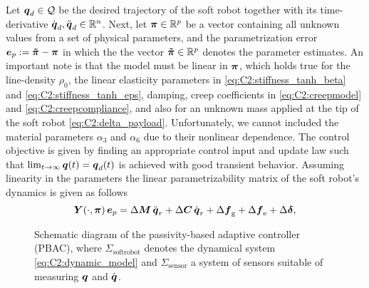 Let ${\boldsymbol{q}}_d \in \mathcal{Q}$ be the desired trajectory of the soft robot together with its time-derivative ${\dot{\boldsymbol{q}}}_d,{\ddot{\boldsymbol{q}}}_d \in {\mathbb{R}^n}$. Next, let $\boldsymbol{\pi} \in \mathbb{R}^p$ be a vector containing all unknown values from a set of physical parameters, and the parametrization error $\boldsymbol{e}_{p} := \boldsymbol{\tilde{\boldsymbol{\pi}}} - \boldsymbol{\pi}$ in which the the vector $\boldsymbol{\tilde{\pi}} \in \mathbb{R}^p$ denotes the parameter estimates.  An important note is that the model must be linear in $\boldsymbol{\pi}$, which holds true for the line-density $\rho_0$, the linear elasticity parameters in \eqref{eq:C2:stiffness_tanh_beta} and \eqref{eq:C2:stiffness_tanh_eps}, damping, creep coefficients in \eqref{eq:C2:creepmodel} and \eqref{eq:C2:creepcompliance}, and also for an unknown mass applied at the tip of the soft robot \eqref{eq:C2:delta_payload}. Unfortunately, we cannot included the material parameters $\alpha_3$  and $\alpha_6$ due to their nonlinear dependence. The control objective is given by finding an appropriate control input and update law such that $\lim_{t\to \infty} {\boldsymbol{q}}(t) = {\boldsymbol{q}}_d(t)$ is achieved with good transient behavior. Assuming linearity in the parameters
the linear parametrizability matrix of the soft robot's dynamics is given as follows
%
\begin{equation}
\boldsymbol{Y}(\cdot,\boldsymbol{\pi})\,{\boldsymbol{e}_p} = \Delta \boldsymbol{M}\,{\ddot{\boldsymbol{q}}}_r + \Delta \boldsymbol{C}\,{\dot{\boldsymbol{q}}}_r + \Delta \boldsymbol{f}_{\scriptstyle\textrm{g}} +  \Delta\boldsymbol{f}_{\scriptstyle\textrm{e}} +  \Delta \boldsymbol{\delta},\label{eq:regress}
\end{equation}
%

\begin{figure}[!t]
    \vspace{-0.6mm}
    \centering
    
    \caption{Schematic diagram of the passivity-based adaptive controller (PBAC), where $\Sigma_{\textrm{softrobot}}$ denotes the dynamical system \eqref{eq:C2:dynamic_model} and $\Sigma_{\textrm{sensor}}$ a system of sensors suitable of measuring ${\boldsymbol{q}}$ and ${\dot{\boldsymbol{q}}}$. }
    \label{fig:C2:PBA_diagram}
  \end{figure}


